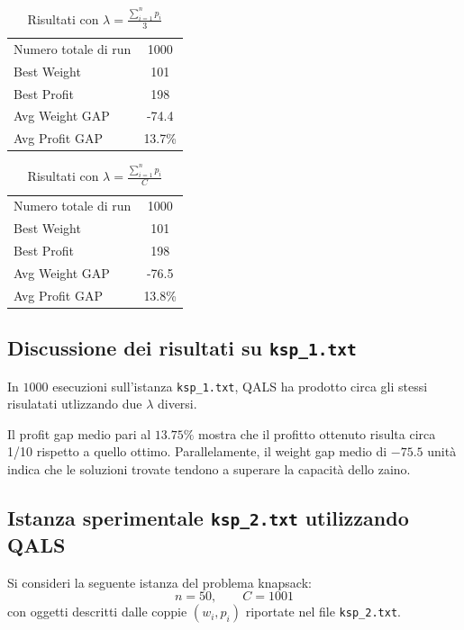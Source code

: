 \documentclass[a4paper,12pt]{article}
\begin{document}
\begin{table}[h!]
\centering
\begin{tabular}{lc}
\toprule
Numero totale di run & 1000 \\
Best Weight & 101 \\
Best Profit & 198 \\
Avg Weight GAP & -74.4 \\
Avg Profit GAP & 13.7\% \\
\bottomrule
\end{tabular}
\caption{Risultati con $\lambda = \displaystyle \frac{\sum_{i=1}^{n} p_i}{3}$}
\end{table}

\begin{table}[h!]
\centering
\begin{tabular}{lc}
\toprule
Numero totale di run & 1000 \\
Best Weight & 101 \\
Best Profit & 198 \\
Avg Weight GAP & -76.5 \\
Avg Profit GAP & 13.8\% \\
\bottomrule
\end{tabular}
\caption{Risultati con $\lambda = \displaystyle \frac{\sum_{i=1}^{n} p_i}{C}$}
\end{table}

\subsection*{Discussione dei risultati su \texttt{ksp\_1.txt}}

In \(1000\) esecuzioni sull'istanza \texttt{ksp\_1.txt}, QALS ha prodotto circa 
gli stessi risulatati utlizzando due $\lambda$ diversi.

Il profit gap medio pari al \(13.75\%\) mostra che 
il profitto ottenuto risulta circa 1/10 rispetto a quello ottimo. Parallelamente, 
il weight gap medio di \(-75.5\) unità indica che le soluzioni trovate tendono a 
superare la capacità dello zaino.

\subsection*{Istanza sperimentale \texttt{ksp\_2.txt} utilizzando QALS}

Si consideri la seguente istanza del problema knapsack:
\[
n = 50, \qquad C = 1001
\]
con oggetti descritti dalle coppie \((w_i, p_i)\) riportate nel file \texttt{ksp\_2.txt}.
\end{document}
